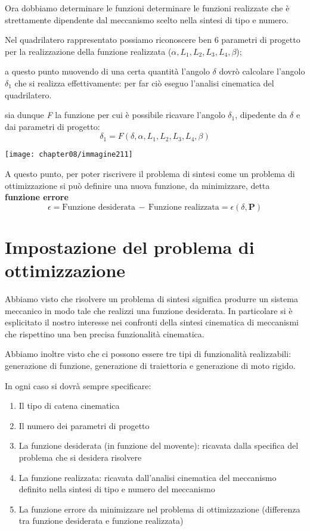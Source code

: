 Ora dobbiamo determinare le funzioni determinare le funzioni realizzate che è strettamente dipendente dal meccanismo scelto nella sintesi di tipo e numero.

Nel quadrilatero rappresentato possiamo riconoscere ben 6 parametri di progetto per la realizzazione della funzione realizzata ($\alpha, L_1, L_2, L_3, L_4, \beta$);

\begin{minipage}{.5\textwidth}
 a questo punto muovendo di una certa quantità l'angolo $\delta$ dovrò calcolare l'angolo $\delta_1$ che si realizza effettivamente: per far ciò eseguo l'analisi cinematica del quadrilatero.

sia dunque \emph{F} la funzione per cui è possibile ricavare l'angolo $\delta_1$, dipedente da $\delta$ e dai parametri di progetto:
\[\delta_1 = F(\delta, \alpha, L_1, L_2, L_3, L_4, \beta)\]
\end{minipage}
\hfill
\begin{minipage}{.5\textwidth}
\centering
\texttt{[image: chapter08/immagine211]}
\end{minipage}
\vspace{1mm}

A questo punto, per poter riscrivere il problema di sintesi come un problema di ottimizzazione si può definire una nuova funzione, da minimizzare, detta \textbf{funzione errore}
\[\epsilon = \text{Funzione desiderata} \, -\,\text{Funzione realizzata} = \epsilon(\delta, \mathbf{P})\]

\section{Impostazione del problema di ottimizzazione}

Abbiamo visto che risolvere un problema di sintesi significa produrre un sistema meccanico in modo tale che realizzi una funzione desiderata. In particolare si è esplicitato il nostro interesse nei confronti della sintesi cinematica di meccanismi che rispettino una ben precisa funzionalità cinematica.

Abbiamo inoltre visto che ci possono essere tre tipi di funzionalità realizzabili: generazione di funzione, generazione di traiettoria e generazione di moto rigido.

In ogni caso si dovrà sempre specificare:
\begin{enumerate}
\item Il tipo di catena cinematica
\item Il numero dei parametri di progetto
\item La funzione desiderata (in funzione del movente): ricavata dalla specifica del problema che si desidera risolvere
\item La funzione realizzata: ricavata dall'analisi cinematica del meccanismo definito nella sintesi di tipo e numero del meccanismo
\item La funzione errore da minimizzare nel problema di ottimizzazione (differenza tra funzione desiderata e funzione realizzata) 
\end{enumerate}

